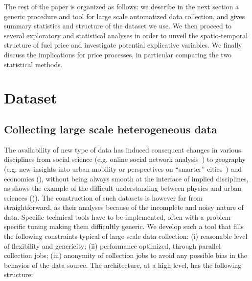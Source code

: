 \documentclass[3p,times,procedia]{elsarticle}
\begin{document}




The rest of the paper is organized as follows: we describe in the next section a generic procedure and tool for large scale automatized data collection, and gives summary statistics and structure of the dataset we use. We then proceed to several exploratory and statistical analyses in order to unveil the spatio-temporal structure of fuel price and investigate potential explicative variables. We finally discuss the implications for price processes, in particular comparing the two statistical methods.



\section{Dataset}

\subsection{Collecting large scale heterogeneous data}

The availability of new type of data has induced consequent changes in various disciplines from social science (e.g. online social network analysis~\cite{tan2013social}) to geography (e.g. new insights into urban mobility or perspectives on ``smarter'' cities~\cite{batty2013big}) and economics (), without being always smooth at the interface of implied disciplines, as shows the example of the difficult understanding between physics and urban sciences (\cite{dupuy2015sciences})). The construction of such datasets is however far from straightforward, as their analyses because of the incomplete and noisy nature of data. Specific technical tools have to be implemented, often with a problem-specific tuning making them difficultly generic. We develop such a tool that fills the following constraints typical of large scale data collection: (i) reasonable level of flexibility and genericity; (ii) performance optimized, through parallel collection jobs; (iii) anonymity of collection jobs to avoid any possible bias in the behavior of the data source. The architecture, at a high level, has the following structure:
\end{document}

